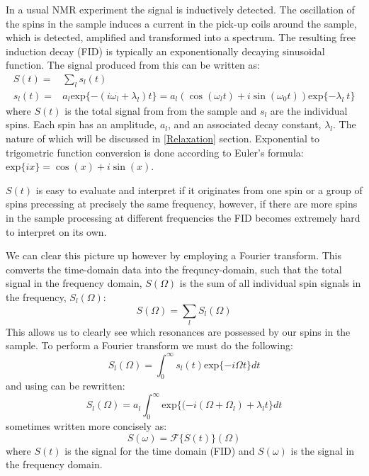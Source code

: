In a usual NMR experiment the signal is inductively detected. The oscillation of the spins in the sample induces
a current in the pick-up coils around the sample, which is detected, amplified and transformed into a spectrum.
The resulting free induction decay (FID) is typically an exponentionally decaying sinusoidal function. The signal
produced from this can be written as:
\begin{align}\label{eqn:signal}
  S(t) =& \sum_l s_l(t) \\
  s_l(t) =& a_l\text{exp}\{-(i\omega_l+\lambda_l)t\} = a_l(\cos(\omega_lt) + i\sin(\omega_0t))\text{exp}\{-\lambda_l~t\}
\end{align}
where $S(t)$ is the total signal from from the sample and $s_l$ are the individual spins. Each spin has an amplitude, $a_l$, and an associated decay constant, $\lambda_l$. The nature of which will be discussed in \ref{Relaxation} section. Exponential to trigometric function conversion
is done according to Euler's formula: $\text{exp}\{ix\} = \cos(x) + i\sin(x)$.

$S(t)$ is easy to evaluate and interpret if it originates from one spin or a group of spins precessing
at precisely the same frequency, however, if there are more spins in the sample processing at different frequencies
the FID becomes extremely hard to interpret on its own.

We can clear this picture up however by employing a Fourier transform. This comverts the time-domain data
into the frequncy-domain, such that the total signal in the frequency domain, $S(\Omega)$ is the sum of all individual spin signals in the frequency, $S_l(\Omega)$:
\begin{equation}
  S(\Omega) = \sum_l S_l(\Omega)
\end{equation}
This allows us to clearly see which resonances are possessed by our spins in the sample. To
perform a Fourier transform we must do the following:
\begin{equation}
  S_l(\Omega) = \int_{0}^{\infty}s_l(t)\text{exp}\{-i\Omega t\}dt
\end{equation}
and using  can be rewritten:
\begin{equation}
  S_l(\Omega) = a_l\int_{0}^{\infty}\text{exp}\{(-i(\Omega+\Omega_l)+\lambda_l t\}dt
\end{equation}
sometimes written more concisely as:
\begin{equation}
  S(\omega) = \mathcal{F}\{S(t)\}(\Omega)
\end{equation}
where $S(t)$ is the signal for the time domain (FID) and $S(\omega)$ is the signal in the frequency domain.

